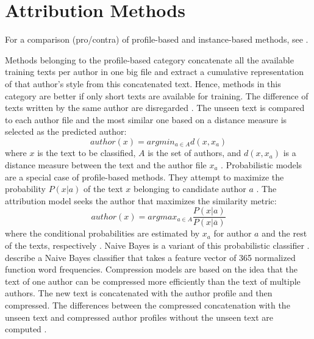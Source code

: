 \section{Attribution Methods}
\label{sec:attribution_methods}

For a comparison (pro/contra) of profile-based and instance-based methods, see \citet{stamatatos_survey_2009}.

Methods belonging to the profile-based category concatenate all the available training texts per author in one big file 
and extract a cumulative representation of that author's style from this concatenated text. %
Hence, methods in this category are better if only short texts are available for training.
The difference of texts written by the same author are disregarded \citep{stamatatos_survey_2009,elmanarelbouanani_authorship_2014,neal_surveying_2018}.
The unseen text is compared to each author file and the most similar one based on a distance measure is selected as the predicted author:
$$ author(x) = argmin_{a \in A} d(x, x_a) $$
where $x$ is the text to be classified, $A$ is the set of authors, and $d(x, x_a)$ is a distance measure 
between the text and the author file $x_a$ \citep{stamatatos_survey_2009}.
Probabilistic models are a special case of profile-based methods.
They attempt to maximize the probability $P(x|a)$ of the text $x$ belonging to candidate author $a$ \citep{stamatatos_survey_2009,neal_surveying_2018}.
The attribution model seeks the author that maximizes the similarity metric: 
$$ author(x) = argmax_{a \in A} \frac{P(x|a)}{P(x|\overline{a})} $$
where the conditional probabilities are estimated by $x_a$ for author $a$ and the rest of the texts, respectively \citep{stamatatos_survey_2009}.
Naive Bayes is a variant of this probabilistic  classifier \citep{stamatatos_survey_2009,elmanarelbouanani_authorship_2014,neal_surveying_2018}.
\citet{elmanarelbouanani_authorship_2014} describe a Naive Bayes classifier that takes a feature vector of 365 normalized function word frequencies.
Compression models are based on the idea that the text of one author can be compressed more efficiently than the text of multiple authors.
The new text is concatenated with the author profile and then compressed.
The differences between the compressed concatenation with the unseen text and compressed author profiles without the unseen text are computed 
\citep{stamatatos_survey_2009,elmanarelbouanani_authorship_2014,neal_surveying_2018}.
